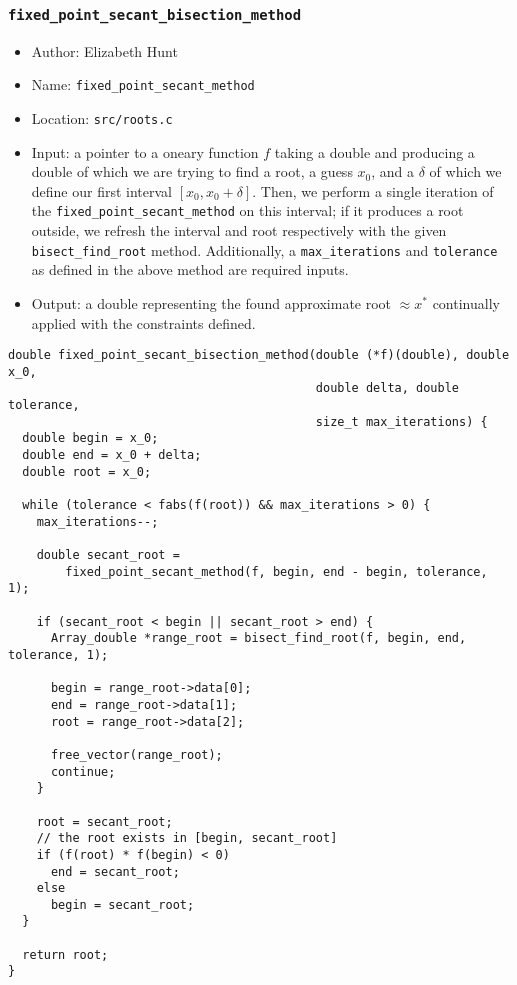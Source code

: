 \documentclass[11pt]{article}
\begin{document}
\subsubsection{\texttt{fixed\_point\_secant\_bisection\_method}}
\label{sec:org72d3074}
\begin{itemize}
\item Author: Elizabeth Hunt
\item Name: \texttt{fixed\_point\_secant\_method}
\item Location: \texttt{src/roots.c}
\item Input: a pointer to a oneary function \(f\) taking a double and producing a double of which we are
trying to find a root, a guess \(x_0\), and a \(\delta\) of which we define our first interval \([x_0, x_0 + \delta]\).
Then, we perform a single iteration of the \texttt{fixed\_point\_secant\_method} on this interval; if it
produces a root outside, we refresh the interval and root respectively with the given
\texttt{bisect\_find\_root} method. Additionally, a \texttt{max\_iterations} and \texttt{tolerance} as defined in the above method are required
inputs.
\item Output: a double representing the found approximate root \(\approx x^*\) continually applied with the
constraints defined.
\end{itemize}

\begin{verbatim}
double fixed_point_secant_bisection_method(double (*f)(double), double x_0,
                                           double delta, double tolerance,
                                           size_t max_iterations) {
  double begin = x_0;
  double end = x_0 + delta;
  double root = x_0;

  while (tolerance < fabs(f(root)) && max_iterations > 0) {
    max_iterations--;

    double secant_root =
        fixed_point_secant_method(f, begin, end - begin, tolerance, 1);

    if (secant_root < begin || secant_root > end) {
      Array_double *range_root = bisect_find_root(f, begin, end, tolerance, 1);

      begin = range_root->data[0];
      end = range_root->data[1];
      root = range_root->data[2];

      free_vector(range_root);
      continue;
    }

    root = secant_root;
    // the root exists in [begin, secant_root]
    if (f(root) * f(begin) < 0)
      end = secant_root;
    else
      begin = secant_root;
  }

  return root;
}
\end{verbatim}
\end{document}
